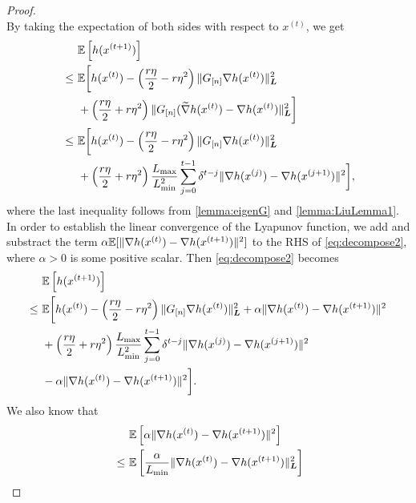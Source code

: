 \begin{proof}
\begin{equation}
    \end{equation}
    By taking the expectation of both sides with respect to $x^{(t)}$, we get
    \begin{equation} \label{eq:decompose2}
    \begin{split}
        &\mathbb{E}\left[ h(x^{(t+1)}) \right]\\
        ~\leq~&\mathbb{E}\bigg[ h(x^{(t)}) - \left( \frac{r \eta }{2} - r \eta^2 \right) \| G_{[n]} \nabla h(x^{(t)}) \|_{\boldsymbol{L}}^2 \\
        &+ \left( \frac{r \eta}{2} + r \eta^2 \right) \| G_{[n]} ( \widetilde{\nabla} h(x^{(t)}) - \nabla h(x^{(t)} ) \|_{\boldsymbol{L}}^2 \bigg] \\
        ~\leq~&\mathbb{E}\bigg[ h(x^{(t)}) - \left( \frac{r \eta }{2} - r \eta^2 \right) \| G_{[n]} \nabla h(x^{(t)}) \|_{\boldsymbol{L}}^2 
        \\&+ \left( \frac{r \eta}{2} + r \eta^2 \right) \frac{L_{\max}}{L_{\min}^2} \sum_{j=0}^{t-1} \delta^{t-j} \| \nabla h(x^{(j)}) - {\nabla} h(x^{(j+1)}) \|^2 \bigg], 
    \end{split}
    \end{equation}
    where the last inequality follows from \autoref{lemma:eigenG} and \autoref{lemma:LiuLemma1}. In order to establish the linear convergence of the Lyapunov function, we add and substract the term $\alpha \mathbb{E}[ \| \nabla h(x^{(t)}) - {\nabla} h(x^{(t+1)}) \|^2 ]$ to the RHS of \eqref{eq:decompose2}, where $\alpha > 0$ is some positive scalar. Then \eqref{eq:decompose2} becomes
    \begin{equation} \label{eq:decompose3}
    \begin{split}
        &\mathbb{E}\left[ h(x^{(t+1)}) \right] \\
        \leq~ &\mathbb{E}\bigg[ h(x^{(t)}) - \left( \frac{r \eta }{2} - r \eta^2 \right) \| G_{[n]} \nabla h(x^{(t)}) \|_{\boldsymbol{L}}^2 + \alpha \| \nabla h(x^{(t)}) - {\nabla} h(x^{(t+1)}) \|^2 \\
        &+ \left( \frac{r \eta}{2} + r \eta^2 \right) \frac{L_{\max}}{L_{\min}^2} \sum_{j=0}^{t-1} \delta^{t-j} \| \nabla h(x^{(j)}) - {\nabla} h(x^{(j+1)}) \|^2 \\
        &- \alpha \| \nabla h(x^{(t)}) - {\nabla} h(x^{(t+1)}) \|^2 \bigg].
    \end{split}
    \end{equation}
    We also know that
    \begin{align*}
        &\mE \left[ \alpha \| \nabla h(x^{(t)}) - {\nabla} h(x^{(t+1)}) \|^2 \right] \\ 
        ~\leq~&  \mE \left[ \frac{\alpha}{L_{\min}} \| \nabla h(x^{(t)}) - {\nabla} h(x^{(t+1)}) \|_{\bL}^2 \right]  \\

\end{align*}
\end{proof}
